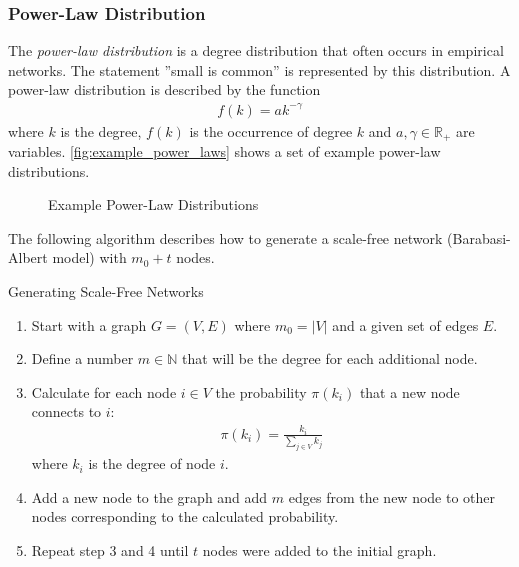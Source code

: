 \documentclass[english]{panikzettel}
\begin{document}
\subsubsection{Power-Law Distribution}\label{sec:power_law}
The \emph{power-law distribution} is a degree distribution that often occurs in empirical networks.
The statement ''small is common'' is represented by this distribution.
A power-law distribution is described by the function
\begin{align*}
	f(k) = ak^{-\gamma}
\end{align*}
where $ k $ is the degree, $ f(k) $ is the occurrence of degree $ k $ and $ a,\gamma \in \mathbb{R}_+ $ are variables. \autoref{fig:example_power_laws} shows a set of example power-law distributions.

\begin{figure}[ht!]
	\centering
	\caption{Example Power-Law Distributions}
	\label{fig:example_power_laws}
\end{figure}

The following algorithm describes how to generate a scale-free network (Barabasi-Albert model) with $ m_0 + t $ nodes.

\begin{algo}{Generating Scale-Free Networks}
\begin{enumerate}
	\item Start with a graph $ G = (V,E) $ where $ m_0 = |V| $ and a given set of edges $ E $.
	\item Define a number $ m \in \mathbb{N} $ that will be the degree for each additional node.
	\item Calculate for each node $ i \in V $ the probability $ \pi(k_i) $ that a new node connects to $ i $:
	\begin{align*}
		\pi(k_i) = \frac{k_i}{\sum_{j \in V} k_j}
	\end{align*}
	where $ k_i $ is the degree of node $ i $.
	\item Add a new node to the graph and add $ m $ edges from the new node to other nodes corresponding to the calculated probability.
	\item Repeat step 3 and 4 until $ t $ nodes were added to the initial graph.
\end{enumerate}
\end{algo}
\end{document}
